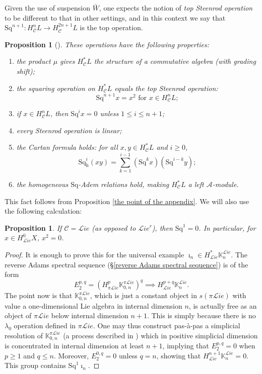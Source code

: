 \documentclass[11pt]{amsart} \renewcommand{\baselinestretch}{1.2}
\theoremstyle{plain}
\newtheorem{prop}[thm]{Proposition}
\numberwithin{equation}{section} %
\theoremstyle{plain}
\newtheorem{prop}[thm]{Proposition}
\numberwithin{equation}{chapter} %
\renewcommand{\to}{\longrightarrow}
\newcommand{\squishlist}{
}
\newcommand{\scrL}{\mathscr{L}}
\newcommand{\calA}{\mathcal{A}}
\newcommand{\calc}{\mathcal{C}}
\newcommand{\citeBOX}[2][]{\cite[\mbox{#1}]{#2}}
\newcommand{\PA}[1]{\pi#1}
\newcommand{\Sq}{\mathrm{Sq}}
\newcommand{\LieSteen}{\calA}
\newcommand{\liealgs}{{\scrL\!\textit{ie}}}
\newcommand{\restliealgs}{{\scrL\!\textit{ie}^\textit{r}}}
\newcommand{\dhor}{_\mathrm{h}}
\newcommand{\Sqh}{\mathrm{Sq}\dhor}
\begin{document}
\begin{Constructing cohomology operations}
Given the use of suspension $\bar{W}$, one expects the notion of \emph{top Steenrod operation} to be different to that in other settings, and in this context we say that $\Sq^{n+1}:H^n_\calc L\to H^{2n+1}_\calc L$ is the top operation.
\begin{prop}[{\citeBOX[\S5.3]{PriddySimplicialLie.pdf}}]
\label{omnibus on coh of simp lie algs}These operations have the following properties:
\begin{enumerate}\squishlist
\item the product $\mu$ gives $H^*_{\calc}L$ the structure of a commutative algebra (with grading shift);
\item the squaring operation on $H^*_{\calc}L$ equals the \emph{top Steenrod operation}:
\[\Sq^{n+1}x=x^{2}\text{\ \ for $x\in H^n_{\calc}L$};\]
\item \label{Sq unstable vanishing} if $x\in H^n_{\calc}L$, then $\Sq^ix=0$ unless $1\leq i\leq n+1$;
\item every Steenrod operation is linear;
\item the \emph{Cartan formula} holds:  for all $x,y\in   H^*_{\calc}L$ and $i\geq0$,
\[\Sqh^i(xy)=\textstyle\sum_{k=1}^{i-1}(\Sq^kx)(\Sq^{i-k}y);\]
\item \label{yeah H is a Stmodule} the  homogeneous $\Sq$-Adem relations hold, making $H^{*}_\calc L$ a left $\LieSteen$-module.
\end{enumerate}
\end{prop}
This fact follows from Proposition \ref{the point of the appendix}. We will also use the following calculation:
\begin{prop}
\label{prop on sq1 on lie not rest}
If $\calc=\liealgs$ (as opposed to $\restliealgs$), then $\Sq^1=0$. In particular, for $x\in H^0_{\liealgs}X$, $x^2=0$.
\end{prop}
\begin{proof}
It is enough to prove this for the universal example $\imath_n\in H^*_{\liealgs}\mathbb{K}_n^{\liealgs}$. The reverse Adams spectral sequence (\S\ref{reverse Adams spectral sequence}) is of the form
\[E_2^{p,q}=(H^{p}_{\PA{\liealgs}}\mathbb{K}_{0,n}^{\PA{\liealgs}})^{q}\implies H^{p+q}_{\liealgs}\mathbb{K}_n^{\liealgs}.\]
The point now is that $\mathbb{K}_{0,n}^{\PA{\liealgs}}$, which is just a constant object in $s(\PA{\liealgs})$ with value a one-dimensional Lie algebra in internal dimension $n$, is actually free as an object of $\PA{\liealgs}$ below internal dimension $n+1$. This is simply because there is no $\lambda_0$ operation defined in $\PA{\liealgs}$. One may thus construct pas-\`a-pas a simplicial resolution of $\mathbb{K}_{0,n}^{\PA{\liealgs}}$ (a process described in \cite{Andre-StepByStep}) which in positive simplicial dimension is concentrated in internal dimension at least $n+1$, implying that $E_2^{p,q}=0$ when $p\geq1$ and $q\leq n$. Moreover, $E_2^{0,q}=0$ unless $q=n$, showing that $H^{n+1}_{\liealgs}\mathbb{K}_n^{\liealgs}=0$. This group contains $\Sq^1\imath_n$.

\end{proof}
\end{Constructing cohomology operations}
\end{document}
